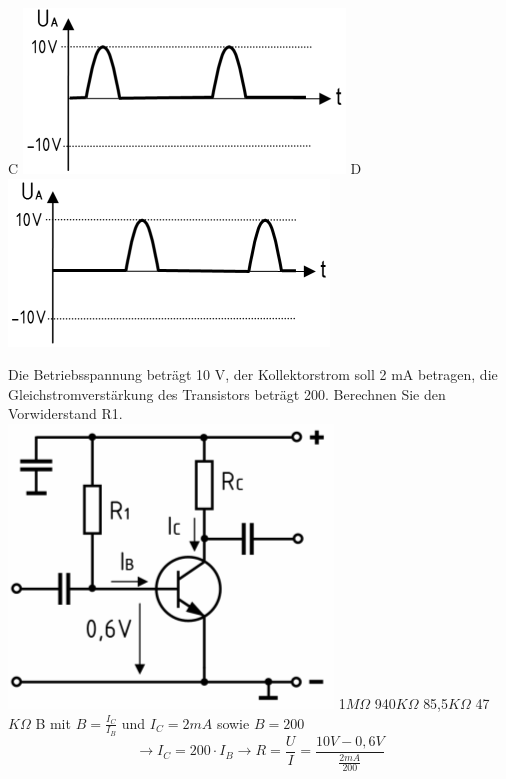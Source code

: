 {	C \includegraphics[scale=0.3]{Transistor/Bilder/TD431_C.png}
	D \includegraphics[scale=0.3]{Transistor/Bilder/TD431_D.png}
	}

\vspace*{0.65cm}

{Die Betriebsspannung beträgt 10 V, der Kollektorstrom soll 2 mA betragen, die Gleichstromverstärkung des Transistors beträgt 200. Berechnen Sie den Vorwiderstand R1.\\
\includegraphics[scale=0.4]{Transistor/Bilder/TC618.png}
}%
{1$M\Omega$}%
{940$K\Omega$}%
{85,5$K\Omega$}%
{47$K\Omega$}%
{B \hspace{3em} mit $B = \frac{I_C}{I_B}$ und $I_C = 2mA$ sowie $B = 200$ \\
    $$\rightarrow I_C = 200 \cdot I_B \rightarrow R 
    = \frac{U}{I} = \frac{10V - 0,6 V}{\frac{2 mA}{200}}$$}%

